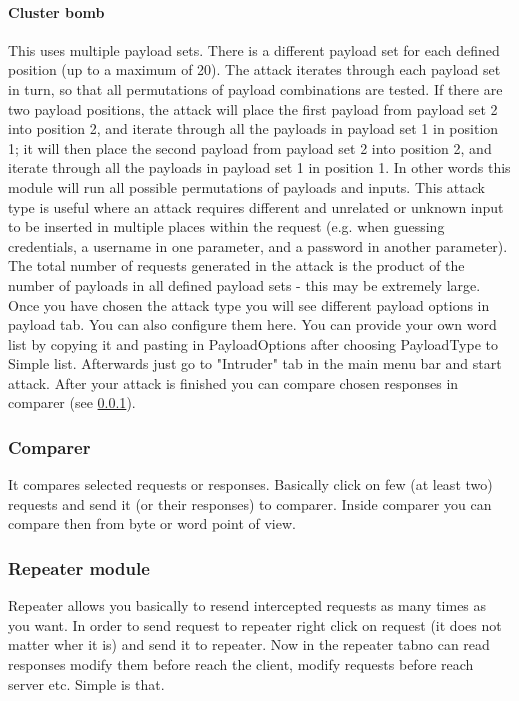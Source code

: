 \paragraph{Cluster bomb}
This uses multiple payload sets.
There is a different payload set for each defined position (up to a maximum of 20).
The attack iterates through each payload set in turn, so that all permutations of payload combinations are tested.
If there are two payload positions, the attack will place the first payload from payload set 2 into position 2, and iterate through all the payloads in payload set 1 in position 1;
it will then place the second payload from payload set 2 into position 2, and iterate through all the payloads in payload set 1 in position 1.
In other words this module will run all possible permutations of payloads and inputs.
This attack type is useful where an attack requires different and unrelated or unknown input to be inserted in multiple places within the request (e.g. when guessing credentials, a username in one parameter, and a password in another parameter).
The total number of requests generated in the attack is the product of the number of payloads in all defined payload sets - this may be extremely large.
\newline
Once you have chosen the attack type you will see different payload options in payload tab.
You can also configure them here.
You can provide your own word list by copying it and pasting in PayloadOptions after choosing PayloadType to Simple list.
Afterwards just go to "Intruder" tab in the main menu bar and start attack.
After your attack is finished you can compare chosen responses in comparer (see \ref{subsubsec:comparer}).

\subsubsection{Comparer}
\label{subsubsec:comparer}
It compares selected requests or responses.
Basically click on few (at least two) requests and send it (or their responses) to comparer.
Inside comparer you can compare then from byte or word point of view.

\subsubsection{Repeater module}

Repeater allows you basically to resend intercepted requests as many times as you want.
In order to send request to repeater right click on request (it does not matter wher it is) and send it to repeater.
Now in the repeater tabno can read responses modify them before reach the client, modify requests before reach server etc.
Simple is that.


